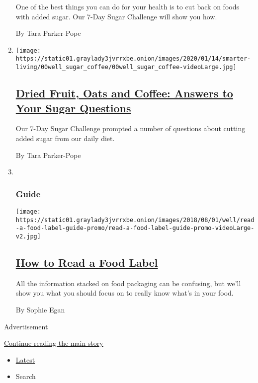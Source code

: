 \begin{enumerate}
  One of the best things you can do for your health is to cut back on
  foods with added sugar. Our 7-Day Sugar Challenge will show you how.

  By Tara Parker-Pope
\item
  \texttt{[image: https://static01.graylady3jvrrxbe.onion/images/2020/01/14/smarter-living/00well\_sugar\_coffee/00well\_sugar\_coffee-videoLarge.jpg]}

  \hypertarget{dried-fruit-oats-and-coffee-answers-to-your-sugar-questions}{%
  \subsection{\texorpdfstring{\href{/2020/01/08/well/eat/diet-sugar-nutrition-foods-health.html}{Dried
  Fruit, Oats and Coffee: Answers to Your Sugar
  Questions}}{Dried Fruit, Oats and Coffee: Answers to Your Sugar Questions}}\label{dried-fruit-oats-and-coffee-answers-to-your-sugar-questions}}

  Our 7-Day Sugar Challenge prompted a number of questions about cutting
  added sugar from our daily diet.

  By Tara Parker-Pope
\item ~
  \hypertarget{guide}{%
  \subsubsection{Guide}\label{guide}}

  \texttt{[image: https://static01.graylady3jvrrxbe.onion/images/2018/08/01/well/read-a-food-label-guide-promo/read-a-food-label-guide-promo-videoLarge-v2.jpg]}

  \hypertarget{how-to-read-a-food-label}{%
  \subsection{\texorpdfstring{\href{/interactive/2018/well/well-food-label-guide.html}{How
  to Read a Food
  Label}}{How to Read a Food Label}}\label{how-to-read-a-food-label}}

  All the information stacked on food packaging can be confusing, but
  we'll show you what you should focus on to really know what's in your
  food.

  By Sophie Egan
\end{enumerate}

Advertisement

\protect\hyperlink{after-mid1}{Continue reading the main story}

\begin{itemize}
\tightlist
\item
  \protect\hyperlink{stream-panel}{Latest}
\item
  Search
\end{itemize}

